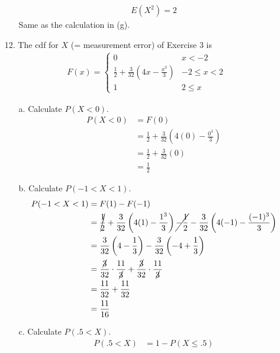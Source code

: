 \documentclass[letterpaper,12pt]{article}
\begin{document}
\begin{enumerate}
\begin{enumerate}
        \begin{align*}
          E(X^2) = 2
        \end{align*}
        Same as the calculation in (g).
    \end{enumerate}
  \item[12.]
    The cdf for $X$ (= measurement error) of Exercise 3 is
    \begin{align*}
      F(x) = \begin{cases}
        0                                                         & x < -2 \\
        \frac{1}{2} + \frac{3}{32}\left(4x - \frac{x^3}{3}\right) & -2 \le x < 2 \\
        1                                                         & 2 \le x
      \end{cases}
    \end{align*}
    \begin{enumerate}
      \item[a.]
        Calculate $P(X < 0)$.
        \begin{align*}
          P(X < 0) &= F(0) \\
          &= \frac{1}{2} + \frac{3}{32}\left(4(0) - \frac{0^3}{3}\right) \\
          &= \frac{1}{2} + \frac{3}{32}(0) \\
          &= \frac{1}{2}
        \end{align*}
      \item[b.]
        Calculate $P(-1 < X < 1)$.
        \begin{align*}
          P(-1 < X < 1) &= F(1) - F(-1) \\
          &= \cancel{\frac{1}{2}} + \frac{3}{32}\left(4(1) - \frac{1^3}{3}\right) \cancel{- \frac{1}{2}} - \frac{3}{32}\left(4(-1) - \frac{(-1)^3}{3}\right) \\
          &= \frac{3}{32}\left(4 - \frac{1}{3}\right) - \frac{3}{32}\left(-4 + \frac{1}{3}\right) \\
          &= \frac{\cancel{3}}{32} \cdot \frac{11}{\cancel{3}} + \frac{\cancel{3}}{32} \cdot \frac{11}{\cancel{3}} \\
          &= \frac{11}{32} + \frac{11}{32} \\
          &= \frac{11}{16}
        \end{align*}
      \item[c.]
        Calculate $P(.5 < X)$.
        \begin{align*}
          P(.5 < X) &= 1 - P(X \le .5) \\

\end{align*}
\end{enumerate}
\end{enumerate}
\end{document}
